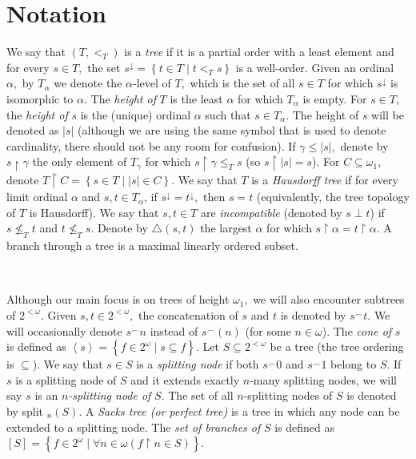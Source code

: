 \documentclass{article}
\begin{document}
\section{Notation \label{Secion notacion}}

We say that $\left(  T,<_{T}\right)  $ is a \emph{tree} if it is a partial
order with a least element and for every $s\in T,$ the set $s^{\downarrow
}=\left\{  t\in T\mid t<_{T}s\right\}  $ is a well-order. Given an ordinal
$\alpha,$ by $T_{\alpha}$ we denote the $\alpha$-level of $T,$ which is the
set of all $s\in T$ for which $s^{\downarrow}$ is isomorphic to $\alpha.$ The
\emph{height of }$T$ is the least $\alpha$ for which $T_{\alpha}$ is empty.
For $s\in T,$ the \emph{height of }$s$ is the (unique) ordinal $\alpha$ such
that $s\in T_{\alpha}.$ The height of $s$ will be denoted as $\left\vert
s\right\vert $ (although we are using the same symbol that is used to denote
cardinality, there should not be any room for confusion). If $\gamma
\leq\left\vert s\right\vert ,$ denote by $s\upharpoonright\gamma$ the only
element of $T_{\gamma}$ for which $s\upharpoonright\gamma\leq_{T}s$ (so
$s\upharpoonright\left\vert s\right\vert =s$). For $C\subseteq\omega_{1},$
denote $T\upharpoonright C=\left\{  s\in T\mid\left\vert s\right\vert \in
C\right\}  .$ We say that $T$ is a \emph{Hausdorff tree }if for every limit
ordinal $\alpha$ and $s,t\in T_{\alpha}$, if $s^{\downarrow}=t^{\downarrow},$
then $s=t$ (equivalently, the tree topology of $T$ is Hausdorff). We say that
$s,t\in T$ are \emph{incompatible }(denoted by $s\perp t$) if $s\nleqslant
_{T}t$ and $t\nleqslant_{T}s.$ Denote by $\triangle\left(  s,t\right)  $ the
largest $\alpha$ for which $s\upharpoonright\alpha=t\upharpoonright\alpha.$ A
branch through a tree is a maximal linearly ordered subset.

\qquad\ \qquad\ \qquad\ 

Although our main focus is on trees of height $\omega_{1},$ we will also
encounter subtrees of $2^{<\omega}.$ Given $s,t\in2^{<\omega},$ the
concatenation of $s$ and $t$ is denoted by $s^{\frown}t.$ We will occasionally
denote $s^{\frown}n$ instead of $s^{\frown}\left(  n\right)  $ (for some
$n\in\omega$). The \emph{cone of }$s$ is defined as $\left\langle
s\right\rangle =\left\{  f\in2^{\omega}\mid s\subseteq f\right\}  .$ Let
$S\subseteq2^{<\omega}$ be a tree (the tree ordering is $\subseteq$). We say
that $s\in S$ is a \emph{splitting node }if both $s^{\frown}0$ and $s^{\frown
}1$ belong to $S.$ If $s$ is a splitting node of $S$ and it extends exactly
$n$-many splitting nodes, we will say $s$ is an $n$\emph{-splitting node of}
$S.$ The set of all $n$-splitting nodes of $S$ is denoted by \textsf{split}%
$_{n}\left(  S\right)  .$ A \emph{Sacks tree (or perfect tree)} is a tree in
which any node can be extended to a splitting node. The \emph{set of branches
of }$S$ is defined as $\left[  S\right]  =\left\{  f\in2^{\omega}\mid\forall
n\in\omega\left(  f\upharpoonright n\in S\right)  \right\}  .$
\end{document}
